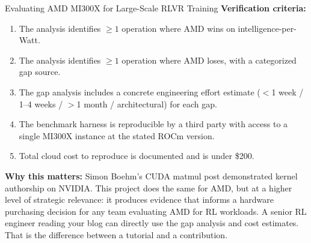 \begin{portfolio}{Evaluating AMD MI300X for Large-Scale RLVR Training}
\textbf{Verification criteria:}
\begin{enumerate}
  \item The analysis identifies $\geq 1$ operation where AMD wins on intelligence-per-Watt.
  \item The analysis identifies $\geq 1$ operation where AMD loses, with a categorized gap source.
  \item The gap analysis includes a concrete engineering effort estimate ($<$1 week / 1--4 weeks / $>$1 month / architectural) for each gap.
  \item The benchmark harness is reproducible by a third party with access to a single MI300X instance at the stated ROCm version.
  \item Total cloud cost to reproduce is documented and is under \$200.
\end{enumerate}

\textbf{Why this matters:} Simon Boehm's CUDA matmul post demonstrated kernel authorship on NVIDIA. This project does the same for AMD, but at a higher level of strategic relevance: it produces evidence that informs a hardware purchasing decision for any team evaluating AMD for RL workloads. A senior RL engineer reading your blog can directly use the gap analysis and cost estimates. That is the difference between a tutorial and a contribution.
\end{portfolio}

\newpage
